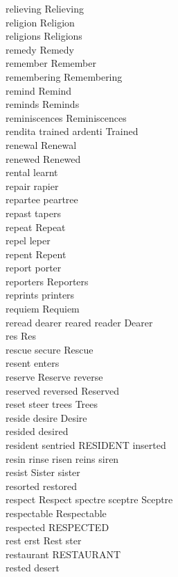 relieving Relieving\\
religion Religion\\
religions Religions\\
remedy Remedy\\
remember Remember\\
remembering Remembering\\
remind Remind\\
reminds Reminds\\
reminiscences Reminiscences\\
rendita trained ardenti Trained\\
renewal Renewal\\
renewed Renewed\\
rental learnt\\
repair rapier\\
repartee peartree\\
repast tapers\\
repeat Repeat\\
repel leper\\
repent Repent\\
report porter\\
reporters Reporters\\
reprints printers\\
requiem Requiem\\
reread dearer reared reader Dearer\\
res Res\\
rescue secure Rescue\\
resent enters\\
reserve Reserve reverse\\
reserved reversed Reserved\\
reset steer trees Trees\\
reside desire Desire\\
resided desired\\
resident sentried RESIDENT inserted\\
resin rinse risen reins siren\\
resist Sister sister\\
resorted restored\\
respect Respect spectre sceptre Sceptre\\
respectable Respectable\\
respected RESPECTED\\
rest erst Rest ster\\
restaurant RESTAURANT\\
rested desert\\
